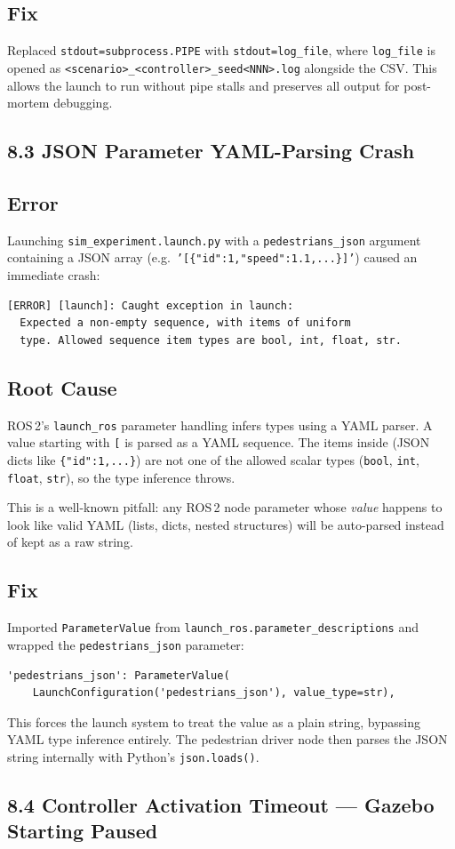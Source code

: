 \documentclass[11pt]{article}
\newcommand{\logentry}[1]{\subsection*{#1}}
\begin{document}
\logentry{Fix}
Replaced \texttt{stdout=subprocess.PIPE} with \texttt{stdout=log\_file}, where
\texttt{log\_file} is opened as
\texttt{<scenario>\_<controller>\_seed<NNN>.log} alongside the CSV.
This allows the launch to run without pipe stalls and preserves all output for
post-mortem debugging.


\subsection*{8.3 JSON Parameter YAML-Parsing Crash}

\logentry{Error}
Launching \texttt{sim\_experiment.launch.py} with a \texttt{pedestrians\_json}
argument containing a JSON array (e.g.\
\texttt{'[\{"id":1,"speed":1.1,...\}]'}) caused an immediate crash:
\begin{verbatim}
[ERROR] [launch]: Caught exception in launch:
  Expected a non-empty sequence, with items of uniform
  type. Allowed sequence item types are bool, int, float, str.
\end{verbatim}

\logentry{Root Cause}
ROS\,2's \texttt{launch\_ros} parameter handling infers types using a YAML
parser.  A value starting with \texttt{[} is parsed as a YAML sequence.  The
items inside (JSON dicts like \texttt{\{"id":1,...\}}) are not one of the
allowed scalar types (\texttt{bool}, \texttt{int}, \texttt{float},
\texttt{str}), so the type inference throws.

This is a well-known pitfall: any ROS\,2 node parameter whose \emph{value}
happens to look like valid YAML (lists, dicts, nested structures) will be
auto-parsed instead of kept as a raw string.

\logentry{Fix}
Imported \texttt{ParameterValue} from \texttt{launch\_ros.parameter\_descriptions}
and wrapped the \texttt{pedestrians\_json} parameter:
\begin{verbatim}
'pedestrians_json': ParameterValue(
    LaunchConfiguration('pedestrians_json'), value_type=str),
\end{verbatim}
This forces the launch system to treat the value as a plain string, bypassing
YAML type inference entirely.  The pedestrian driver node then parses the JSON
string internally with Python's \texttt{json.loads()}.


\subsection*{8.4 Controller Activation Timeout --- Gazebo Starting Paused}
\end{document}
